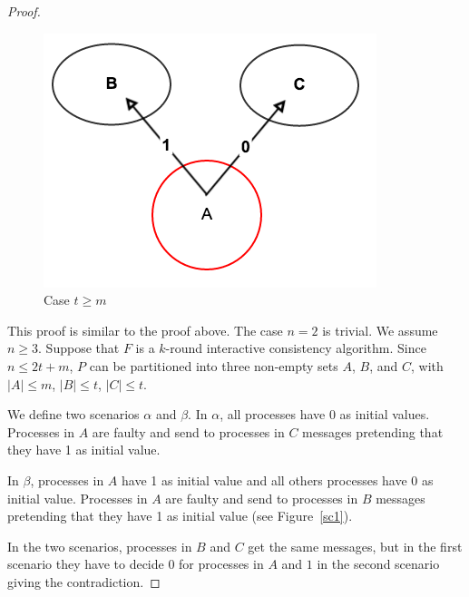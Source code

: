 \begin{proof}
\begin{figure}[h]
  \centering
  \includegraphics[scale=0.35]{impossible2.png}
  \caption{Case $t \geqslant m$  }
\end{figure}\label{sc2}

  This proof is similar to the proof above. 
  The case $n=2$ is trivial. We assume $n \geqslant 3$.
  Suppose that $F$ is a $k$-round  interactive
  consistency algorithm. Since $n \leqslant 2t+m$, $P$ can be partitioned into
  three non-empty sets $A$, $B$, and $C$, with $| A | \leqslant m$, $| B | \leqslant t$, $| C |
  \leqslant t$. 
  
   We define two scenarios $\alpha$ and $\beta$.
  In $\alpha$, all processes have 0 as initial values.
  Processes in $A$ are faulty and send to processes in $C$  messages
  pretending that they have  1 as initial value. 
  
   In $\beta$, processes in $A$ have 1 as initial value and all  others processes have 0 as initial value.
  Processes in $A$ are faulty and send to processes in $B$ messages 
  pretending that they have 1 as initial value (see Figure~\ref{sc1}).
  
  In the two scenarios, processes in $B$ and $C$  get the same messages, but in the first scenario 
  they have to decide 0 for processes in $A$ and $1$ in the second scenario giving the contradiction.
    

\end{proof}
